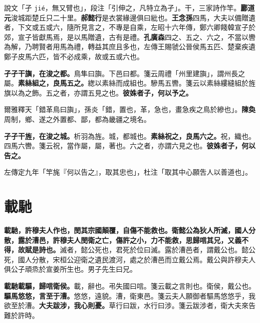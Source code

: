 \begin{quoting}說文「孑 \texttt{jié}，無又臂也」，段注「引伸之，凡特立為孑」。干，三家詩作竿。\textbf{酈道元}浚城距楚丘只二十里。\textbf{郝懿行}是衣裳緣邊俱曰紕也。\textbf{王念孫}四馬，大夫以備贈遺者，下文或五或六，隨所見言之，不專是自乘，左昭十六年傳，鄭六卿餞韓宣子於郊，宣子皆獻馬焉，是以馬贈遺，古有是禮。\textbf{孔廣森}四之、五之、六之，不當以轡為解，乃聘賢者用馬為禮，轉益其庶且多也，左傳王賜虢公晉侯馬五匹、楚棄疾遺鄭子皮馬六匹，皆不必成乘，故或五或六也。\end{quoting}

\textbf{孑孑干旟，在浚之都。}{\footnotesize 鳥隼曰旟。下邑曰都。箋云周禮「州里建旟」，謂州長之屬。}\textbf{素絲組之，良馬五之。}{\footnotesize 緫以素絲而成組也。驂馬五轡。箋云以素絲縷縫組於旌旗以為之飾。五之者，亦謂五見之也。}\textbf{彼姝者子，何以予之。}

\begin{quoting}爾雅釋天「錯革鳥曰旟」，孫炎「錯，置也，革，急也，畫急疾之鳥於縿也」。\textbf{陳奐}周制，鄉、遂之外置都、鄙，都為畿疆之境名。\end{quoting}

\textbf{孑孑干旌，在浚之城。}{\footnotesize 析羽為旌。城，都城也。}\textbf{素絲祝之，良馬六之。}{\footnotesize 祝，織也。四馬六轡。箋云祝，當作屬，屬，著也。六之者，亦謂六見之也。}\textbf{彼姝者子，何以告之。}

\begin{quoting}左傳定九年「竿旄『何以告之』，取其忠也」，杜注「取其中心願吿人以善道也」。\end{quoting}

\section{載馳}


\textbf{載馳，許穆夫人作也，閔其宗國顛覆，自傷不能救也。衛懿公為狄人所滅，國人分散，露於漕邑，許穆夫人閔衛之亡，傷許之小，力不能救，思歸唁其兄，又義不得，故賦是詩也。}{\footnotesize 滅者，懿公死也，君死於位曰滅。露於漕邑者，謂戴公也。懿公死，國人分散，宋桓公迎衛之遺民渡河，處之於漕邑而立戴公焉。戴公與許穆夫人俱公子頑烝於宣姜所生也。男子先生曰兄。}

\textbf{載馳載驅，歸唁衛侯。}{\footnotesize 載，辭也。弔失國曰唁。箋云載之言則也。衛侯，戴公也。}\textbf{驅馬悠悠，言至于漕。}{\footnotesize 悠悠，遠貌。漕，衛東邑。箋云夫人願御者驅馬悠悠乎，我欲至於漕。}\textbf{大夫跋涉，我心則憂。}{\footnotesize 草行曰跋，水行曰涉。箋云跋涉者，衛大夫來告難於許時。}

